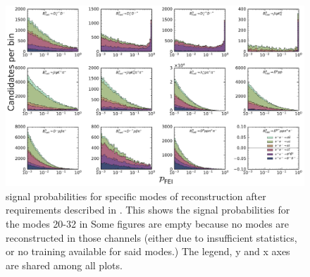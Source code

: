 \begin{figure}[htbp!]

    \includegraphics[width=1\textwidth]{figures/appendices/FEI_signal_probabilities/Bz_feiSigProbs2.pdf}

    \caption{\label{fig:feisigprobs4} \FEI signal probabilities for specific modes of \Bz reconstruction after requirements described in .
    This shows the signal probabilities for the modes 20-32 in 
    Some figures are empty because no modes are reconstructed in those channels (either due to insufficient statistics, or no training available for said modes.)
    The legend, y and x axes are shared among all plots.
    }
\end{figure}